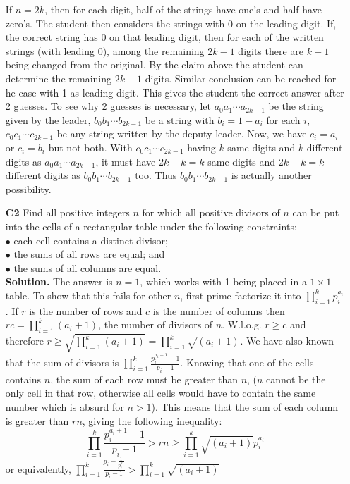 \documentclass[11pt,a4paper]{article}
\begin{document}
\begin{itemize}
If $n=2k$, then for each digit, half of the strings have one's and half have zero's. 
The student then considers the strings with 0 on the leading digit. 
If, the correct string has 0 on that leading digit, then for each of the written strings (with leading 0), among the remaining $2k-1$ digits there are $k-1$ being changed from the original. By the claim above the student can determine the remaining $2k-1$ digits. 
Similar conclusion can be reached for he case with 1 as leading digit. 
This gives the student the correct answer after 2 guesses. 
To see why 2 guesses is necessary, let $a_0a_1\cdots a_{2k-1}$ be the string given by the leader, $b_0b_1\cdots b_{2k-1}$ be a string with $b_i=1-a_i$ for each $i$, $c_0c_1\cdots c_{2k-1}$ be any string written by the deputy leader. 
Now, we have $c_i=a_i$ or $c_i=b_i$ but not both. 
With $c_0c_1\cdots c_{2k-1}$ having $k$ same digits and $k$ different digits as $a_0a_1\cdots a_{2k-1}$, 
it must have $2k-k=k$ same digits and $2k-k=k$ different digits as $b_0b_1\cdots b_{2k-1}$ too. 
Thus $b_0b_1\cdots b_{2k-1}$ is actually another possibility. 

\item[\textbf{C2}]
Find all positive integers $n$ for which all positive divisors of $n$ can be put into the cells of a rectangular table under the following constraints:\\
$\bullet$ each cell contains a distinct divisor;\\
$\bullet$ the sums of all rows are equal; and\\
$\bullet$ the sums of all columns are equal.\\

\textbf{Solution.} 
The answer is $n=1$, which works with 1 being placed in a $1\times 1$ table. 
To show that this fails for other $n$, first prime factorize it into 
$\displaystyle\prod_{i=1}^k p_i^{a_i}$. 
If $r$ is the number of rows and $c$ is the number of columns then $rc=\displaystyle\prod_{i=1}^k (a_i+1)$, 
the number of divisors of $n$. 
W.l.o.g. $r\ge c$ and therefore $r\ge\sqrt{\displaystyle\prod_{i=1}^k (a_i+1)}=\displaystyle\prod_{i=1}^k \sqrt{(a_i+1)}$. 
We have also known that the sum of divisors is 
$\displaystyle\prod_{i=1}^k \frac{p_i^{a_i+1}-1}{p_i-1}$. 
Knowing that one of the cells contains $n$, the sum of each row must be greater than $n$, 
($n$ cannot be the only cell in that row, otherwise all cells would have to contain the same number which is absurd for $n>1$). 
This means that the sum of each column is greater than $rn$, giving the following inequality: 
$$\displaystyle\prod_{i=1}^k \frac{p_i^{a_i+1}-1}{p_i-1}>rn\ge\displaystyle\prod_{i=1}^k \sqrt{(a_i+1)}p_i^{a_i}$$
or equivalently, 
$\displaystyle\prod_{i=1}^k \frac{p_i-\frac{1}{p_i^{a_i}}}{p_i-1}>\displaystyle\prod_{i=1}^k \sqrt{(a_i+1)}$


\end{itemize}
\end{document}
